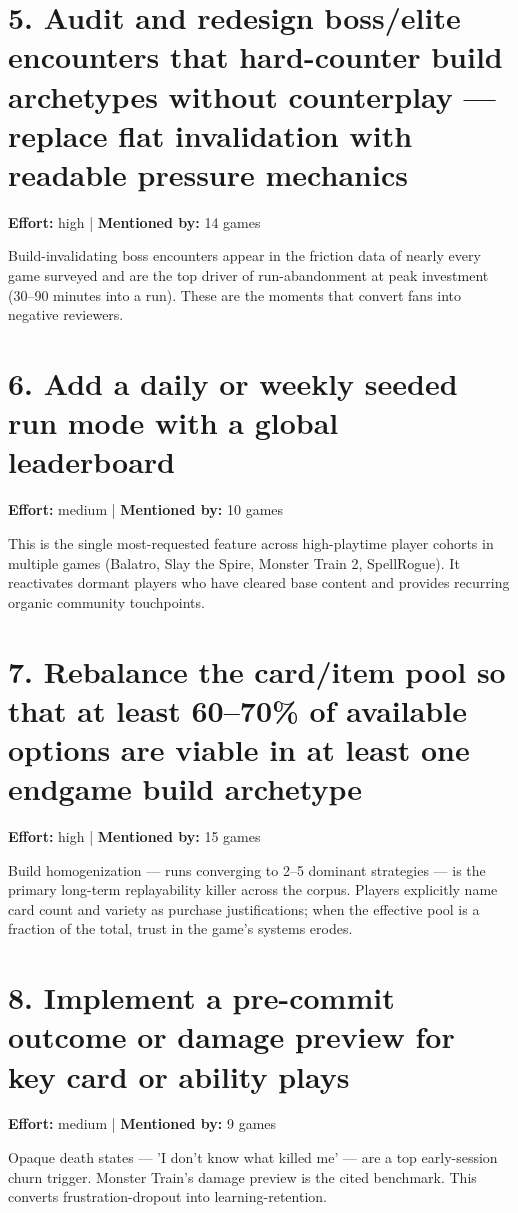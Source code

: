 \documentclass[11pt,letterpaper]{report}
\begin{document}
\section*{5. Audit and redesign boss/elite encounters that hard-counter build archetypes without counterplay — replace flat invalidation with readable pressure mechanics}
\label{sec:org305883e}
\textbf{Effort:} high | \textbf{Mentioned by:} 14 games

Build-invalidating boss encounters appear in the friction data of nearly every game surveyed and are the top driver of run-abandonment at peak investment (30–90 minutes into a run). These are the moments that convert fans into negative reviewers.
\section*{6. Add a daily or weekly seeded run mode with a global leaderboard}
\label{sec:org79cb8e4}
\textbf{Effort:} medium | \textbf{Mentioned by:} 10 games

This is the single most-requested feature across high-playtime player cohorts in multiple games (Balatro, Slay the Spire, Monster Train 2, SpellRogue). It reactivates dormant players who have cleared base content and provides recurring organic community touchpoints.
\section*{7. Rebalance the card/item pool so that at least 60–70\% of available options are viable in at least one endgame build archetype}
\label{sec:orgc192f04}
\textbf{Effort:} high | \textbf{Mentioned by:} 15 games

Build homogenization — runs converging to 2–5 dominant strategies — is the primary long-term replayability killer across the corpus. Players explicitly name card count and variety as purchase justifications; when the effective pool is a fraction of the total, trust in the game's systems erodes.
\section*{8. Implement a pre-commit outcome or damage preview for key card or ability plays}
\label{sec:orgb7ab7e3}
\textbf{Effort:} medium | \textbf{Mentioned by:} 9 games

Opaque death states — 'I don't know what killed me' — are a top early-session churn trigger. Monster Train's damage preview is the cited benchmark. This converts frustration-dropout into learning-retention.
\end{document}

